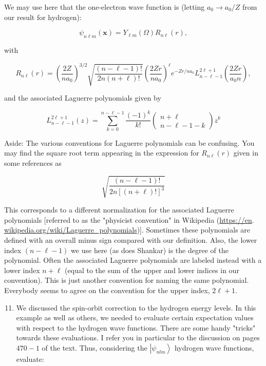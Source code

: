 \documentclass[12pt]{article}
\begin{document}
We may use here that the one-electron wave function is (letting $a_{0} \rightarrow a_{0} / Z$ from our result for hydrogen):

$$
\psi_{n \ell m}(\mathbf{x})=Y_{\ell m}(\Omega) R_{n \ell}(r),
$$

with

$$
R_{n \ell}(r)=\left(\frac{2 Z}{n a_{0}}\right)^{3 / 2} \sqrt{\frac{(n-\ell-1) !}{2 n(n+\ell) !}}\left(\frac{2 Z r}{n a_{0}}\right)^{\ell} e^{-Z r / n a_{0}} L_{n-\ell-1}^{2 \ell+1}\left(\frac{2 Z r}{a_{0} n}\right),
$$

and the associated Laguerre polynomials given by

$$
L_{n-\ell-1}^{2 \ell+1}(z)=\sum_{k=0}^{n-\ell-1} \frac{(-1)^{k}}{k !}\left(\begin{array}{c}
n+\ell \\
n-\ell-1-k
\end{array}\right) z^{k}
$$

Aside: The various conventions for Laguerre polynomials can be confusing. You may find the square root term appearing in the expression for $R_{n \ell}(r)$ given in some references as

$$
\sqrt{\frac{(n-\ell-1) !}{2 n[(n+\ell) !]^{3}}}
$$

This corresponds to a different normalization for the associated Laguerre polynomials [referred to as the "physicist convention" in Wikipedia (\href{https://en}{https://en}. \href{http://wikipedia.org/wiki/Laguerre_polynomials}{wikipedia.org/wiki/Laguerre\_polynomials})]. Sometimes these polynomials are defined with an overall minus sign compared with our definition. Also, the lower index $(n-\ell-1)$ we use here (as does Shankar) is the degree of the polynomial. Often the associated Laguerre polynomials are labeled instead with a lower index $n+\ell$ (equal to the sum of the upper and lower indices in our convention). This is just another convention for naming the same polynomial. Everybody seems to agree on the convention for the upper index, $2 \ell+1$.

\begin{enumerate}
  \setcounter{enumi}{10}
  \item We discussed the spin-orbit correction to the hydrogen energy levels. In this example as well as others, we needed to evaluate certain expectation values with respect to the hydrogen wave functions. There are some handy "tricks" towards these evaluations. I refer you in particular to the discussion on pages $470-1$ of the text. Thus, considering the $\left|\psi_{n l m}\right\rangle$ hydrogen wave functions, evaluate:
\end{enumerate}
\end{document}
